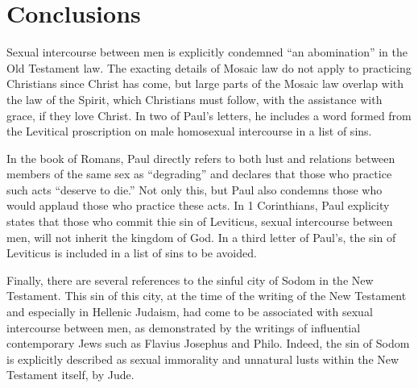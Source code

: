 \documentclass[10pt]{article}
\begin{document}
\section*{Conclusions}

Sexual intercourse between men is explicitly condemned ``an abomination'' in the Old Testament law. The exacting details of Mosaic law do not apply to practicing Christians since Christ has come, but large parts of the Mosaic law overlap with the law of the Spirit, which Christians must follow, with the assistance with grace, if they love Christ. In two of Paul's letters, he includes a word formed from the Levitical proscription on male homosexual intercourse in a list of sins.


In the book of Romans, Paul directly refers to both lust and relations between members of the same sex as ``degrading'' and declares that those who practice such acts ``deserve to die.'' Not only this, but Paul also condemns those who would applaud those who practice these acts. In 1 Corinthians, Paul explicity states that those who commit thie sin of Leviticus, sexual intercourse between men, will not inherit the kingdom of God. In a third letter of Paul's, the sin of Leviticus is included in a list of sins to be avoided.

Finally, there are several references to the sinful city of Sodom in the New Testament. This sin of this city, at the time of the writing of the New Testament and especially in Hellenic Judaism, had come to be associated with sexual intercourse between men, as demonstrated by the writings of influential contemporary Jews such as Flavius Josephus and Philo. Indeed, the sin of Sodom is explicitly described as sexual immorality and unnatural lusts within the New Testament itself, by Jude. 


\end{document}
